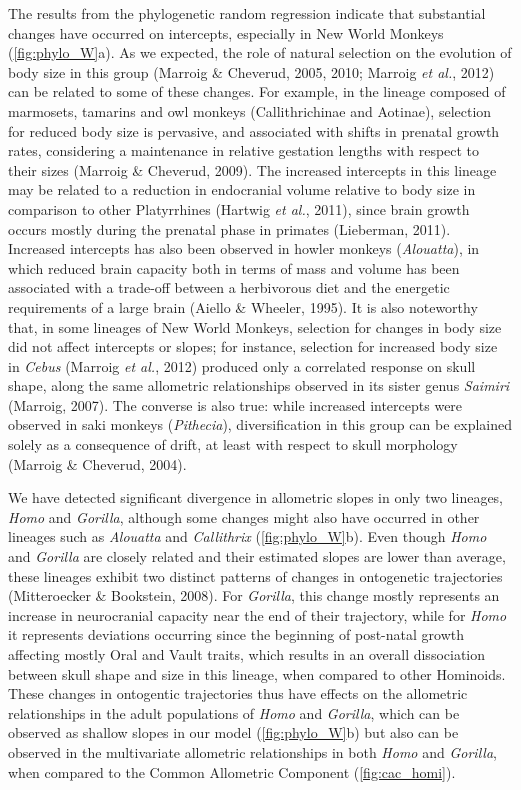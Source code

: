 \documentclass[12pt,twoside]{report}
\begin{document}
The results from the phylogenetic random regression indicate that
substantial changes have occurred on intercepts, especially in New World
Monkeys (\autoref{fig:phylo_W}a). As we expected, the role of natural
selection on the evolution of body size in this group (Marroig \&
Cheverud, 2005, 2010; Marroig \emph{et al.}, 2012) can be related to
some of these changes. For example, in the lineage composed of
marmosets, tamarins and owl monkeys (Callithrichinae and Aotinae),
selection for reduced body size is pervasive, and associated with shifts
in prenatal growth rates, considering a maintenance in relative
gestation lengths with respect to their sizes (Marroig \& Cheverud,
2009). The increased intercepts in this lineage may be related to a
reduction in endocranial volume relative to body size in comparison to
other Platyrrhines (Hartwig \emph{et al.}, 2011), since brain growth
occurs mostly during the prenatal phase in primates (Lieberman, 2011).
Increased intercepts has also been observed in howler monkeys
(\emph{Alouatta}), in which reduced brain capacity both in terms of mass
and volume has been associated with a trade-off between a herbivorous
diet and the energetic requirements of a large brain (Aiello \& Wheeler,
1995). It is also noteworthy that, in some lineages of New World
Monkeys, selection for changes in body size did not affect intercepts or
slopes; for instance, selection for increased body size in \emph{Cebus}
(Marroig \emph{et al.}, 2012) produced only a correlated response on
skull shape, along the same allometric relationships observed in its
sister genus \emph{Saimiri} (Marroig, 2007). The converse is also true:
while increased intercepts were observed in saki monkeys
(\emph{Pithecia}), diversification in this group can be explained solely
as a consequence of drift, at least with respect to skull morphology
(Marroig \& Cheverud, 2004).

We have detected significant divergence in allometric slopes in only two
lineages, \emph{Homo} and \emph{Gorilla}, although some changes might
also have occurred in other lineages such as \emph{Alouatta} and
\emph{Callithrix} (\autoref{fig:phylo_W}b). Even though \emph{Homo} and
\emph{Gorilla} are closely related and their estimated slopes are lower
than average, these lineages exhibit two distinct patterns of changes in
ontogenetic trajectories (Mitteroecker \& Bookstein, 2008). For
\emph{Gorilla}, this change mostly represents an increase in
neurocranial capacity near the end of their trajectory, while for
\emph{Homo} it represents deviations occurring since the beginning of
post-natal growth affecting mostly Oral and Vault traits, which results
in an overall dissociation between skull shape and size in this lineage,
when compared to other Hominoids. These changes in ontogentic
trajectories thus have effects on the allometric relationships in the
adult populations of \emph{Homo} and \emph{Gorilla}, which can be
observed as shallow slopes in our model (\autoref{fig:phylo_W}b) but
also can be observed in the multivariate allometric relationships in
both \emph{Homo} and \emph{Gorilla}, when compared to the Common
Allometric Component (\autoref{fig:cac_homi}).
\end{document}
